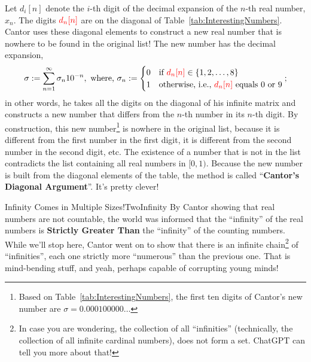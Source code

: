 Let $d_i[n]$ denote the $i$-th digit of the decimal expansion of the $n$-th real number, $x_n$. The digits $ \color{red} d_n[n]$ are on the diagonal of Table~\ref{tab:InterestingNumbers}. Cantor uses these diagonal elements to construct a new real number that is nowhere to be found in the original list! The new number has the decimal expansion,
$$ \sigma:=\sum_{n=1}^\infty \sigma_n 10^{-n}, \text{ where, }
\sigma_n := \begin{cases}
    0 & \text{if } {\color{red}d_n[n]} \in \{1, 2, \ldots, 8 \} \\
    1 & \text{otherwise, i.e., } {\color{red}d_n[n]} \text{ equals 0 or 9}\\
\end{cases};$$
in other words, he takes all the digits on the diagonal of his infinite matrix and constructs a new number that differs from the $n$-th number in its $n$-th digit. By construction, this new number\footnote{Based on Table~\ref{tab:InterestingNumbers}, the first ten digits of Cantor's new number are $\sigma = 0.000100000 \ldots$} is nowhere in the original list, because it is different from the first number in the first digit, it is different from the second number in the second digit, etc. The existence of a number that is not in the list contradicts the list containing all real numbers in $[0, 1)$. Because the new number is built from the diagonal elements of the table, the method is called ``\textbf{Cantor's Diagonal Argument}''. It's pretty clever!

\begin{funColor}{Infinity Comes in Multiple Sizes!}{TwoInfinity}
    By Cantor showing that real numbers are not countable, the world was informed that the ``infinity'' of the real numbers is \textbf{Strictly Greater Than} the ``infinity'' of the counting numbers. While we'll stop here, Cantor went on to show that there is an infinite chain\footnote{In case you are wondering, the collection of all ``infinities'' (technically, the collection of all infinite cardinal numbers), does not form a set. ChatGPT can tell you more about that!} of ``infinities'', each one strictly more ``numerous'' than the previous one. That is mind-bending stuff, and yeah, perhaps capable of corrupting young minds!
\end{funColor}

